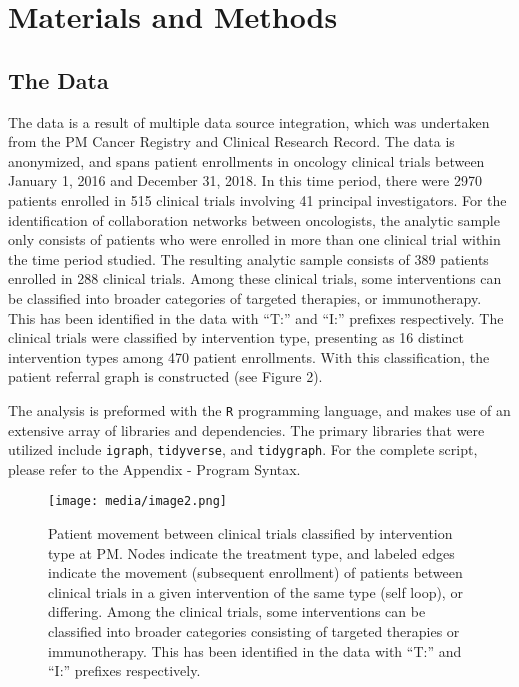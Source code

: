 \documentclass{article}
\begin{document}
\section{Materials and Methods}\label{materials-and-methods}

\subsection{The Data}\label{the-data}

The data is a result of multiple data source integration, which was
undertaken from the PM Cancer Registry and Clinical Research Record. 
The data is anonymized, and spans patient enrollments in oncology clinical
trials between January 1, 2016 and December 31, 2018. In this time
period, there were 2970 patients enrolled in 515 clinical trials involving
41 principal investigators. For the identification of collaboration networks
between oncologists, the analytic sample only consists of patients who
were enrolled in more than one clinical trial within the time period studied. 
The resulting analytic sample consists of 389 patients
enrolled in 288 clinical trials. Among these clinical trials, some
interventions can be classified into broader categories of
targeted therapies, or immunotherapy. This has been identified in the data
with ``T:'' and ``I:'' prefixes respectively. The clinical trials were
classified by intervention type, presenting as 16 distinct intervention types among
470 patient enrollments. With this classification, the patient referral
graph is constructed (see Figure 2).

The analysis is preformed with the \texttt{R} programming language, and
makes use of an extensive array of libraries and dependencies. The
primary libraries that were utilized include \texttt{igraph}, \texttt{tidyverse},
and \texttt{tidygraph}. For the complete script, please refer to the Appendix -
Program Syntax.
\begin{figure}
\centering
\texttt{[image: media/image2.png]}
\caption{Patient movement between clinical trials classified
by intervention type at PM. Nodes indicate the treatment type, and
labeled edges indicate the movement (subsequent enrollment) of patients between clinical trials in a given
intervention of the same type (self loop), or differing. Among the
clinical trials, some interventions can be classified into broader
categories consisting of targeted therapies or immunotherapy. This has
been identified in the data with ``T:'' and ``I:'' prefixes
respectively.}
\end{figure}
\end{document}
